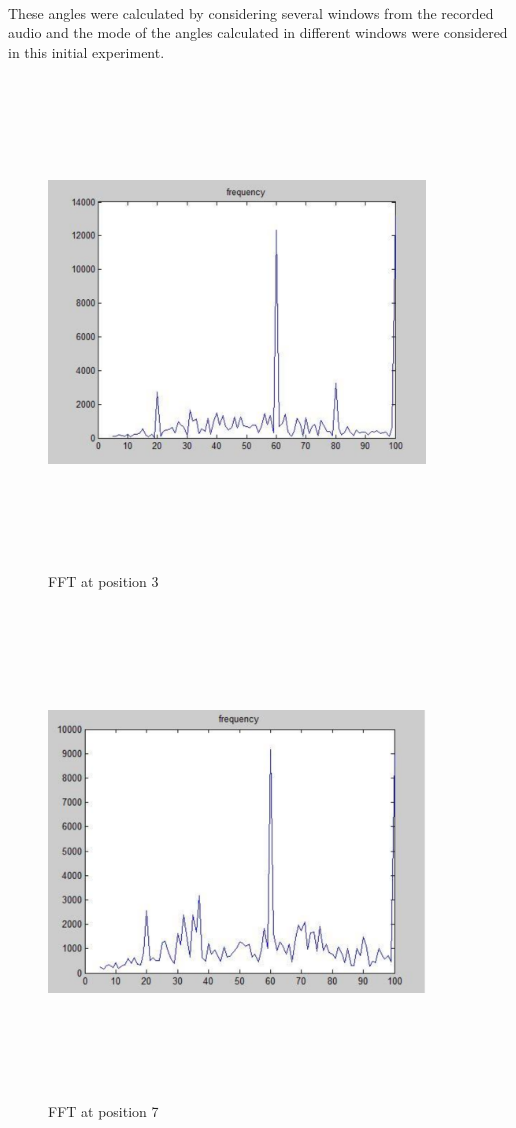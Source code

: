 \documentclass[12pt]{article}
\numberwithin{figure}{section}
\numberwithin{table}{section}
\begin{document}
\paragraph{}
These angles were calculated by considering several windows from the recorded audio and the mode of the angles calculated in different windows were considered in this initial experiment.

\begin{figure}[H]
\centering

\includegraphics[width=10cm,height=13cm,keepaspectratio]{position3.png}
\caption{FFT at position 3}
\label{d:p3}
\end{figure}

\begin{figure}[H]
\centering
\includegraphics[width=10cm,height=13cm,keepaspectratio]{position7.png}
\caption{FFT at position 7}
\label{d:p7}
\end{figure}
\end{document}
